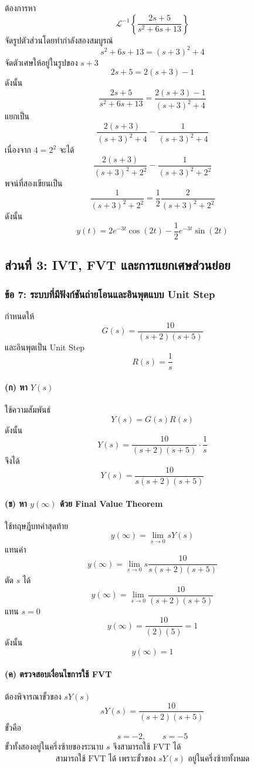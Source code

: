 ต้องการหา
\[
\mathcal{L}^{-1}\left\{\frac{2s+5}{s^2+6s+13}\right\}
\]
จัดรูปตัวส่วนโดยทำกำลังสองสมบูรณ์
\[
s^2+6s+13=(s+3)^2+4
\]
จัดตัวเศษให้อยู่ในรูปของ $s+3$
\[
2s+5=2(s+3)-1
\]
ดังนั้น
\[
\frac{2s+5}{s^2+6s+13}
=
\frac{2(s+3)-1}{(s+3)^2+4}
\]
แยกเป็น
\[
\frac{2(s+3)}{(s+3)^2+4}-\frac{1}{(s+3)^2+4}
\]
เนื่องจาก $4=2^2$ จะได้
\[
\frac{2(s+3)}{(s+3)^2+2^2}-\frac{1}{(s+3)^2+2^2}
\]
พจน์ที่สองเขียนเป็น
\[
\frac{1}{(s+3)^2+2^2}=\frac{1}{2}\frac{2}{(s+3)^2+2^2}
\]
ดังนั้น
\[
\boxed{y(t)=2e^{-3t}\cos(2t)-\frac{1}{2}e^{-3t}\sin(2t)}
\]

\subsection{ส่วนที่ 3: IVT, FVT และการแยกเศษส่วนย่อย}

\subsubsection{ข้อ 7: ระบบที่มีฟังก์ชันถ่ายโอนและอินพุตแบบ Unit Step}

กำหนดให้
\[
G(s)=\frac{10}{(s+2)(s+5)}
\]
และอินพุตเป็น Unit Step
\[
R(s)=\frac{1}{s}
\]

\paragraph{(ก) หา $Y(s)$}

ใช้ความสัมพันธ์
\[
Y(s)=G(s)R(s)
\]
ดังนั้น
\[
Y(s)=\frac{10}{(s+2)(s+5)}\cdot\frac{1}{s}
\]
จึงได้
\[
\boxed{Y(s)=\frac{10}{s(s+2)(s+5)}}
\]

\paragraph{(ข) หา $y(\infty)$ ด้วย Final Value Theorem}

ใช้ทฤษฎีบทค่าสุดท้าย
\[
y(\infty)=\lim_{s\to 0}sY(s)
\]
แทนค่า
\[
y(\infty)=\lim_{s\to 0}s\frac{10}{s(s+2)(s+5)}
\]
ตัด $s$ ได้
\[
y(\infty)=\lim_{s\to 0}\frac{10}{(s+2)(s+5)}
\]
แทน $s=0$
\[
y(\infty)=\frac{10}{(2)(5)}=1
\]
ดังนั้น
\[
\boxed{y(\infty)=1}
\]

\paragraph{(ค) ตรวจสอบเงื่อนไขการใช้ FVT}

ต้องพิจารณาขั้วของ $sY(s)$
\[
sY(s)=\frac{10}{(s+2)(s+5)}
\]
ขั้วคือ
\[
s=-2,\qquad s=-5
\]
ขั้วทั้งสองอยู่ในครึ่งซ้ายของระนาบ $s$ จึงสามารถใช้ FVT ได้
\[
\boxed{\text{สามารถใช้ FVT ได้ เพราะขั้วของ }sY(s)\text{ อยู่ในครึ่งซ้ายทั้งหมด}}
\]

